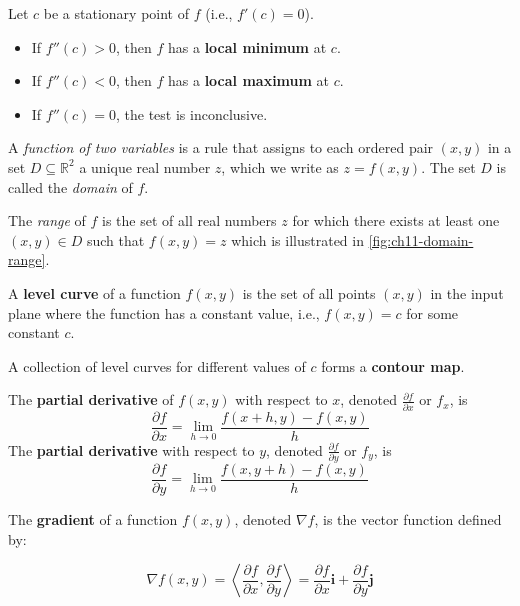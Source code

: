 \begin{theorem}
    Let \(c\) be a stationary point of \(f\) (i.e., \(f'(c) = 0\)).
    \begin{itemize}
        \item If \(f''(c) > 0\), then \(f\) has a \textbf{local minimum} at \(c\).
        \item If \(f''(c) < 0\), then \(f\) has a \textbf{local maximum} at \(c\).
        \item If \(f''(c) = 0\), the test is inconclusive.
    \end{itemize}
\end{theorem}


\begin{definition}
A \emph{function of two variables} is a rule that assigns to each ordered pair \((x, y)\) in a set \(D \subseteq \mathbb{R}^2\) a unique real number \(z\), which we write as \(z = f(x, y)\). The set \(D\) is called the \emph{domain} of \(f\).

The \emph{range} of \(f\) is the set of all real numbers \(z\) for which there exists at least one \((x, y) \in D\) such that \(f(x, y) = z\) which is illustrated in \autoref{fig:ch11-domain-range}.
\end{definition}

\begin{definition}
A \textbf{level curve} of a function \(f(x, y)\) is the set of all points \((x, y)\) in the input plane where the function has a constant value, i.e., \(f(x, y) = c\) for some constant \(c\).

A collection of level curves for different values of \(c\) forms a \textbf{contour map}.
\end{definition}

\begin{definition}
The \textbf{partial derivative} of \( f(x, y) \) with respect to \( x \), denoted \( \frac{\partial f}{\partial x} \) or \( f_x \), is
$$
\frac{\partial f}{\partial x} = \lim_{h \to 0} \frac{f(x+h, y) - f(x, y)}{h}
$$
The \textbf{partial derivative} with respect to \( y \), denoted \( \frac{\partial f}{\partial y} \) or \( f_y \), is
$$
\frac{\partial f}{\partial y} = \lim_{h \to 0} \frac{f(x, y+h) - f(x, y)}{h}
$$
\end{definition}

\begin{definition}
The \textbf{gradient} of a function \( f(x, y) \), denoted \( \nabla f \), is the vector function defined by:

$$
\nabla f(x, y) = \left\langle \frac{\partial f}{\partial x}, \frac{\partial f}{\partial y} \right\rangle = \frac{\partial f}{\partial x} \mathbf{i} + \frac{\partial f}{\partial y} \mathbf{j}
$$

\end{definition}

